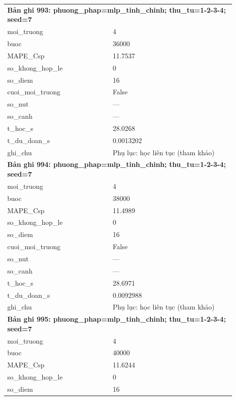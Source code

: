 \begin{longtable}{p{0.43\linewidth}p{0.50\linewidth}}
\midrule
\multicolumn{2}{p{0.95\linewidth}}{\textbf{Bản ghi 993: phuong\_phap=mlp\_tinh\_chinh; thu\_tu=1-2-3-4; seed=7}} \\
moi\_\allowbreak truong & 4 \\
buoc & 36000 \\
MAPE\_\allowbreak Csp & 11.7537 \\
so\_\allowbreak khong\_\allowbreak hop\_\allowbreak le & 0 \\
so\_\allowbreak diem & 16 \\
cuoi\_\allowbreak moi\_\allowbreak truong & False \\
so\_\allowbreak nut & — \\
so\_\allowbreak canh & — \\
t\_\allowbreak hoc\_\allowbreak s & 28.0268 \\
t\_\allowbreak du\_\allowbreak doan\_\allowbreak s & 0.0013202 \\
ghi\_\allowbreak chu & Phụ lục: học liên tục (tham khảo) \\
\midrule
\multicolumn{2}{p{0.95\linewidth}}{\textbf{Bản ghi 994: phuong\_phap=mlp\_tinh\_chinh; thu\_tu=1-2-3-4; seed=7}} \\
moi\_\allowbreak truong & 4 \\
buoc & 38000 \\
MAPE\_\allowbreak Csp & 11.4989 \\
so\_\allowbreak khong\_\allowbreak hop\_\allowbreak le & 0 \\
so\_\allowbreak diem & 16 \\
cuoi\_\allowbreak moi\_\allowbreak truong & False \\
so\_\allowbreak nut & — \\
so\_\allowbreak canh & — \\
t\_\allowbreak hoc\_\allowbreak s & 28.6971 \\
t\_\allowbreak du\_\allowbreak doan\_\allowbreak s & 0.0092988 \\
ghi\_\allowbreak chu & Phụ lục: học liên tục (tham khảo) \\
\midrule
\multicolumn{2}{p{0.95\linewidth}}{\textbf{Bản ghi 995: phuong\_phap=mlp\_tinh\_chinh; thu\_tu=1-2-3-4; seed=7}} \\
moi\_\allowbreak truong & 4 \\
buoc & 40000 \\
MAPE\_\allowbreak Csp & 11.6244 \\
so\_\allowbreak khong\_\allowbreak hop\_\allowbreak le & 0 \\
so\_\allowbreak diem & 16 \\

\end{longtable}
